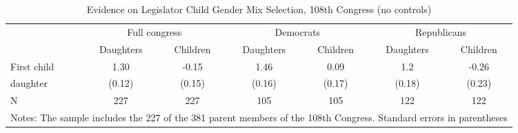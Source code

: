 \documentclass{article}
\begin{document}
\begin{table}
\caption{Evidence on Legislator Child Gender Mix Selection, 108th Congress (no controls)  }
\begin{center}
\begin{tabular}{l c c c c c c } 
\hline
\hline
  & \multicolumn{2}{c}{ Full congress}  & \multicolumn{2}{c}{ Democrats} & \multicolumn{2}{c}{ Republicans}\\
  
  & Daughters & Children & Daughters & Children & Daughters & Children \\
  
\hline

First child & 1.30 & -0.15 & 1.46 & 0.09 & 1.2 &-0.26 \\

daughter & (0.12) & (0.15) & (0.16) & (0.17) & (0.18) & (0.23) \\

N & 227 & 227 & 105 & 105 & 122 & 122 \\

\hline

\multicolumn{7}{m{13cm}}{Notes: The sample includes the 227 of the 381 parent members of the 108th Congress. Standard errors in parentheses  }

\end{tabular}
\label{table:coefficients}
\end{center}
\end{table}
\end{document}
